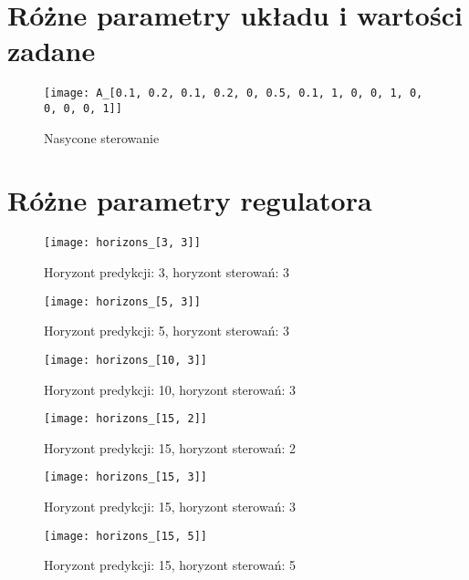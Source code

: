 \section{Różne parametry układu i wartości zadane}
\begin{figure}[p]
    \centering
	\texttt{[image: A\_[0.1, 0.2, 0.1, 0.2, 0, 0.5, 0.1, 1, 0, 0, 1, 0, 0, 0, 0, 1]]}
	\caption{Nasycone sterowanie}
	\label{fig:saturated}
\end{figure}

\section{Różne parametry regulatora}
\begin{figure}[p]
    \centering
	\texttt{[image: horizons\_[3, 3]]}
	\caption{Horyzont predykcji: 3, horyzont sterowań: 3}
	\label{fig:horizons_3_3}
\end{figure}

\begin{figure}[p]
    \centering
	\texttt{[image: horizons\_[5, 3]]}
	\caption{Horyzont predykcji: 5, horyzont sterowań: 3}
	\label{fig:horizons_5_3}
\end{figure}

\begin{figure}[p]
    \centering
	\texttt{[image: horizons\_[10, 3]]}
	\caption{Horyzont predykcji: 10, horyzont sterowań: 3}
	\label{fig:horizons_10_3}
\end{figure}

\begin{figure}[p]
    \centering
	\texttt{[image: horizons\_[15, 2]]}
	\caption{Horyzont predykcji: 15, horyzont sterowań: 2}
	\label{fig:horizons_15_2}
\end{figure}

\begin{figure}[p]
    \centering
	\texttt{[image: horizons\_[15, 3]]}
	\caption{Horyzont predykcji: 15, horyzont sterowań: 3}
	\label{fig:horizons_15_3}
\end{figure}

\begin{figure}[p]
    \centering
	\texttt{[image: horizons\_[15, 5]]}
	\caption{Horyzont predykcji: 15, horyzont sterowań: 5}
	\label{fig:horizons_15_5}
\end{figure}

